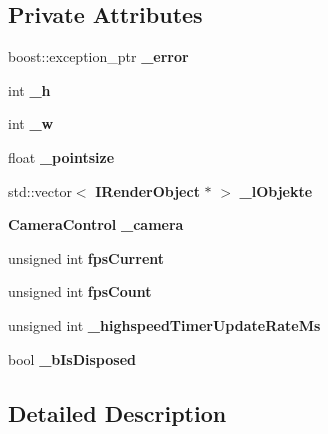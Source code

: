 \subsection*{Private Attributes}
\begin{DoxyCompactItemize}
\item 
boost\-::exception\-\_\-ptr {\bfseries \-\_\-error}\label{classSoundfieldViewer_1_1RenderEngine_a9b5bd7ca56e744a8e111c5fcb6a43380}

\item 
int {\bfseries \-\_\-h}\label{classSoundfieldViewer_1_1RenderEngine_a79b80617dd40436e8cf7fa9fc316616c}

\item 
int {\bfseries \-\_\-w}\label{classSoundfieldViewer_1_1RenderEngine_ad307dbf3378ba5875f1decd50ddcf149}

\item 
float {\bfseries \-\_\-pointsize}\label{classSoundfieldViewer_1_1RenderEngine_ab3892c739ca0ba0474f8f217d7510e26}

\item 
std\-::vector$<$ {\bf I\-Render\-Object} $\ast$ $>$ {\bfseries \-\_\-l\-Objekte}\label{classSoundfieldViewer_1_1RenderEngine_a7a31e13a9dd22686e3b1e95035b59327}

\item 
{\bf Camera\-Control} {\bfseries \-\_\-camera}\label{classSoundfieldViewer_1_1RenderEngine_ad7f6574d0d7c575f2fb7c75eb77f7fbb}

\item 
unsigned int {\bfseries fps\-Current}\label{classSoundfieldViewer_1_1RenderEngine_afba1e0ce703ab68a69d4009d9c51b3ae}

\item 
unsigned int {\bfseries fps\-Count}\label{classSoundfieldViewer_1_1RenderEngine_abef679c6aa3f80bd45f486b306ca17ac}

\item 
unsigned int {\bfseries \-\_\-highspeed\-Timer\-Update\-Rate\-Ms}\label{classSoundfieldViewer_1_1RenderEngine_ae44e533e0074be9a0a714f2a9795e30b}

\item 
bool {\bfseries \-\_\-b\-Is\-Disposed}\label{classSoundfieldViewer_1_1RenderEngine_a230fe98c7e902b56a72f0cfc3d2d699b}

\end{DoxyCompactItemize}


\subsection{Detailed Description}


